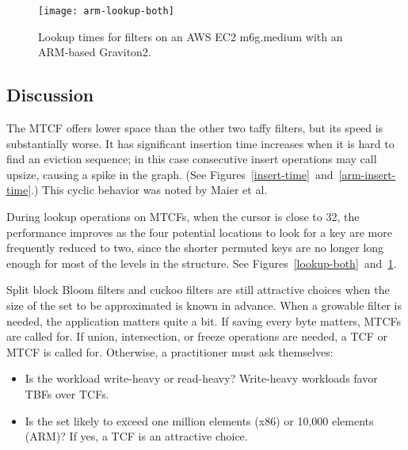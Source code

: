 \documentclass[letterpaper,twocolumn,10pt]{article}
\newcommand{\etal}{et al.}
\begin{document}
\begin{figure}
  \texttt{[image: arm-lookup-both]}
  \caption{
    \label{arm-lookup-both}
    Lookup times for filters on an AWS EC2 m6g.medium with an ARM-based Graviton2.
  }
\end{figure}


\subsection{Discussion}

The MTCF offers lower space than the other two taffy filters, but its speed is substantially worse.
It has significant insertion time increases when it is hard to find an eviction sequence; in this case consecutive insert operations may call upsize, causing a spike in the graph. (See Figures~\ref{insert-time}~and~\ref{arm-insert-time}.)
This cyclic behavior was noted by Maier \etal~\cite{dysect}

During lookup operations on MTCFs, when the cursor is close to 32, the performance improves as the four potential locations to look for a key are more frequently reduced to two, since the shorter permuted keys are no longer long enough for most of the levels in the structure.
See Figures~\ref{lookup-both}~and~\ref{arm-lookup-both}.

Split block Bloom filters and cuckoo filters are still attractive choices when the size of the set to be approximated is known in advance.
When a growable filter is needed, the application matters quite a bit.
If saving every byte matters, MTCFs are called for.
If union, intersection, or freeze operations are needed, a TCF or MTCF is called for.
Otherwise, a practitioner must ask themselves:

\begin{itemize}
\item Is the workload write-heavy or read-heavy?
  Write-heavy workloads favor TBFs over TCFs.
\item Is the set likely to exceed one million elements (x86) or 10,000 elements (ARM)?
  If yes, a TCF is an attractive choice.
\end{itemize}
\end{document}
